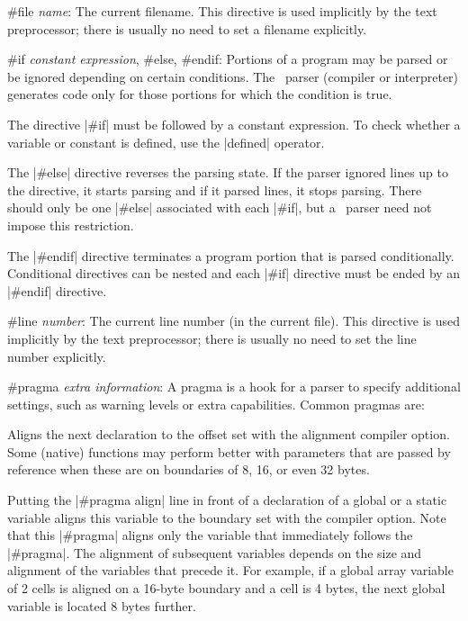 \item \#file {\it name\/}: 
        The current filename. This directive is used implicitly by the text
        preprocessor; there is usually no need to set a filename explicitly.

\item \#if {\it constant expression\/}, \#else, \#endif: 
        Portions of a program may be parsed or be ignored depending on certain
        conditions. The \Small\ parser (compiler or interpreter) generates code
        only for those portions for which the condition is true.

        The directive |#if| must be followed by a constant expression. To
        check whether a variable or constant is defined, use the |defined|
        operator.

        The |#else| directive reverses the parsing state. If the parser
        ignored lines up to the directive, it starts parsing and if it parsed
        lines, it stops parsing. There should only be one |#else| associated
        with each |#if|, but a \Small\ parser need not impose this restriction.

        The |#endif| directive terminates a program portion that is parsed
        conditionally. Conditional directives can be nested and each |#if|
        directive must be ended by an |#endif| directive.

\item \#line {\it number\/}: 
        The current line number (in the current file). This directive is used
        implicitly by the text preprocessor; there is usually no need to set
        the line number explicitly.

\item \#pragma {\it extra information\/}:
        A pragma is a hook for a parser to specify additional settings, such
        as warning levels or extra capabilities. Common pragmas are:

        \beginlist{35pt}
         \lbreak {} 
                Aligns the next declaration to the offset set with the alignment
                compiler option. Some (native) functions may perform better
                with parameters that are passed by reference when these are
                on boundaries of 8, 16, or even 32 bytes.

                Putting the |#pragma align| line in front of a declaration of
                a global or a static variable aligns this variable to the
                boundary set with the compiler option. Note that this |#pragma|
                aligns only the variable that immediately follows the |#pragma|.
                The alignment of subsequent variables depends on the size and
                alignment of the variables that precede it. For example, if a
                global array variable of 2 cells is aligned on a 16-byte
                boundary and a cell is 4 bytes, the next global variable is
                located 8 bytes further.

